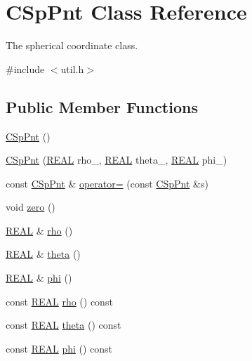 \hypertarget{classCSpPnt}{\section{C\-Sp\-Pnt Class Reference}
\label{classCSpPnt}
}


The spherical coordinate class.  




{\ttfamily \#include $<$util.\-h$>$}

\subsection*{Public Member Functions}
\begin{DoxyCompactItemize}
\item 
\hyperlink{classCSpPnt_ab2366cfde717accefce56fc72aa5a2ed}{C\-Sp\-Pnt} ()
\item 
\hyperlink{classCSpPnt_a2d035000bbff43189d79affc0447a9a3}{C\-Sp\-Pnt} (\hyperlink{util_8h_a5821460e95a0800cf9f24c38915cbbde}{R\-E\-A\-L} rho\-\_\-, \hyperlink{util_8h_a5821460e95a0800cf9f24c38915cbbde}{R\-E\-A\-L} theta\-\_\-, \hyperlink{util_8h_a5821460e95a0800cf9f24c38915cbbde}{R\-E\-A\-L} phi\-\_\-)
\item 
const \hyperlink{classCSpPnt}{C\-Sp\-Pnt} \& \hyperlink{classCSpPnt_aee31a3b97c734fa150f1a33daadd6dfc}{operator=} (const \hyperlink{classCSpPnt}{C\-Sp\-Pnt} \&s)
\item 
void \hyperlink{classCSpPnt_a9525366e1c144421d07c0a1485256f82}{zero} ()
\item 
\hyperlink{util_8h_a5821460e95a0800cf9f24c38915cbbde}{R\-E\-A\-L} \& \hyperlink{classCSpPnt_af6364f003b923aa77c880869d27caa64}{rho} ()
\item 
\hyperlink{util_8h_a5821460e95a0800cf9f24c38915cbbde}{R\-E\-A\-L} \& \hyperlink{classCSpPnt_a4b48e7760135fc768ab6911a328194ba}{theta} ()
\item 
\hyperlink{util_8h_a5821460e95a0800cf9f24c38915cbbde}{R\-E\-A\-L} \& \hyperlink{classCSpPnt_af4f411d4a656dfec7c5a69ba065dbe1d}{phi} ()
\item 
const \hyperlink{util_8h_a5821460e95a0800cf9f24c38915cbbde}{R\-E\-A\-L} \hyperlink{classCSpPnt_ad7366f49f0fde0b19a3682ace6b606ba}{rho} () const 
\item 
const \hyperlink{util_8h_a5821460e95a0800cf9f24c38915cbbde}{R\-E\-A\-L} \hyperlink{classCSpPnt_aed72be0c307a800a1b7565ba80d87e1f}{theta} () const 
\item 
const \hyperlink{util_8h_a5821460e95a0800cf9f24c38915cbbde}{R\-E\-A\-L} \hyperlink{classCSpPnt_a4ecdc3162c71e20aed001b40a497a339}{phi} () const 
\end{DoxyCompactItemize}
